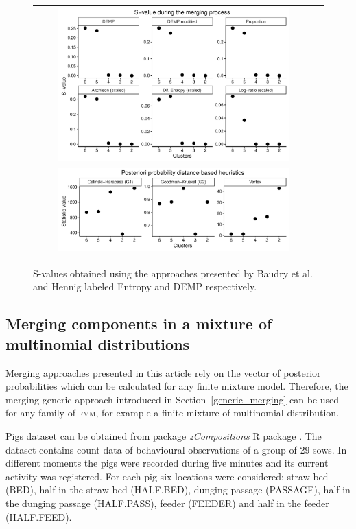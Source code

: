 \documentclass[submit]{smj}
\theoremstyle{definition}
\newcommand{\fmm}{\textsc{fmm}\xspace}
\begin{document}
\begin{figure}[t]
\begin{center}
\begin{tabular}{cc}
  \includegraphics[width=0.85\textwidth]{figures/gaussian_Svalues.pdf} \\
   \includegraphics[width=0.85\textwidth]{figures/gaussian_statistics.pdf}
 \end{tabular}
 \caption{S-values obtained using the approaches presented by Baudry et al. and Hennig labeled Entropy and DEMP respectively.}\label{gaussian_Svalues}
\end{center}
\end{figure}

\subsection{Merging components in a mixture of multinomial distributions}\label{multinom_example}

Merging approaches presented in this article rely on the vector of posterior probabilities which can be calculated for any finite mixture model. Therefore, the merging generic approach introduced in Section~\ref{generic_merging} can be used for any family of \fmm, for example a finite mixture of multinomial distribution.

Pigs dataset can be obtained from package \emph{zCompositions} R package \citep{palarea2015zcompositions}. The dataset contains count data of behavioural observations of a group of 29 sows. In different moments the pigs were recorded during five minutes and its current activity was registered. For each pig six locations were considered: straw bed (BED), half in the straw bed (HALF.BED), dunging passage (PASSAGE), half in the dunging passage (HALF.PASS), feeder (FEEDER) and half in the feeder (HALF.FEED).
\end{document}

